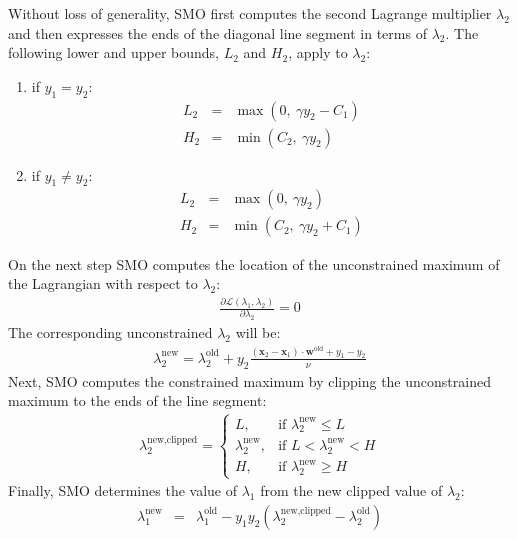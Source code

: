 Without loss of generality, SMO first computes the second Lagrange multiplier $\lambda_2$ and then expresses the ends of the diagonal line segment in terms of $\lambda_2$. 
The following lower and upper bounds, $L_2$ and $H_2$, apply to  $ \lambda_2$: 
\begin{enumerate}
 \item if $y_1=y_2$:
  \begin{eqnarray*}
   L_2&=&\max(0,~\gamma y_2 - C_1)\\
   H_2&=&\min(C_2,~\gamma y_2)
  \end{eqnarray*}
 \item if $y_1 \neq y_2$:
  \begin{eqnarray*}
   L_2&=&\max(0,~\gamma y_2)\\
   H_2&=&\min(C_2,~ \gamma y_2 + C_1)
  \end{eqnarray*}
\end{enumerate}
%
On the next step SMO computes the location of the unconstrained maximum of the Lagrangian with respect to $\lambda_2$:
\begin{eqnarray}
\frac {\partial \mathcal{L}(\lambda_1,\lambda_2) }{\partial \lambda_2} = 0
\end{eqnarray}
The corresponding unconstrained  $\lambda_2$ will be:
\begin{eqnarray}
\lambda_2^{\text{new}}=\lambda_2^{\text{old}} + y_2 \frac{
(\mathbf{x}_{2} 
- \mathbf{x}_{1})\cdot\mathbf{w}^{\text{old}} + y_1 - y_2
}{\nu}
\end{eqnarray}
Next, SMO computes the constrained maximum by clipping the unconstrained maximum to the ends of the line segment:
  \begin{eqnarray}
   \lambda_2^{\text{new,clipped}} = 
  \begin{cases}
 L,&\text{if } \lambda_2^{\text{new}}\le L\\
  \lambda_2^{\text{new}},&\text{if }L<\lambda_2^{\text{new}}<H\\
 H,&\text{if }\lambda_2^{\text{new}}\ge H
\end{cases}
    \end{eqnarray}
Finally, SMO determines the value of  $\lambda_1$ from the new clipped value of $\lambda_2$: 
 \begin{eqnarray}
   \lambda_1^{\text{new}}&=&\lambda_1^{\text{old}} - y_1 y_2 ( \lambda_2^{\text{new,clipped}}- \lambda_2^{\text{old}})
 \end{eqnarray}

